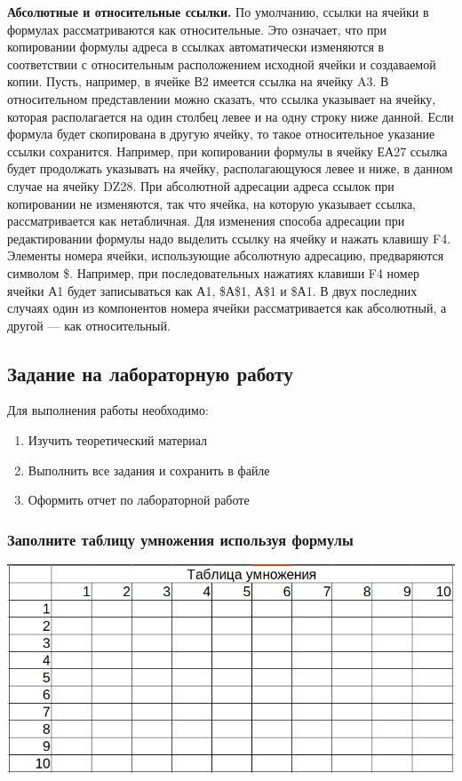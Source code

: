 \documentclass[a4paper]{article}
\begin{document}
\textbf{Абсолютные и относительные ссылки.} По умолчанию, ссылки на ячейки в формулах рассматриваются как относительные. Это означает, что при копировании формулы адреса в ссылках автоматически изменяются в соответствии с относительным расположением исходной ячейки и создаваемой копии. Пусть, например, в ячейке В2 имеется ссылка на ячейку A3. В относительном представлении можно сказать, что ссылка указывает на ячейку, которая располагается на один столбец левее и на одну строку ниже данной. Если формула будет скопирована в другую ячейку, то такое относительное указание ссылки сохранится. Например, при копировании формулы в ячейку ЕА27 ссылка будет продолжать указывать на ячейку, располагающуюся левее и ниже, в данном случае на ячейку DZ28. При абсолютной адресации адреса ссылок при копировании не изменяются, так что ячейка, на которую указывает ссылка, рассматривается как нетабличная. Для изменения способа адресации при редактировании формулы надо выделить ссылку на ячейку и нажать клавишу F4. Элементы номера ячейки, использующие абсолютную адресацию, предваряются символом \$. Например, при последовательных нажатиях клавиши F4 номер ячейки А1 будет записываться как А1, \$А\$1, А\$1 и \$А1. В двух последних случаях один из компонентов номера ячейки рассматривается как абсолютный, а другой --- как относительный.

\newpage
\subsection{Задание на лабораторную работу}

Для выполнения работы необходимо:
\begin{enumerate}
  \item Изучить теоретический материал
  \item Выполнить все задания и сохранить в файле
  \item Оформить отчет по лабораторной работе
\end{enumerate}

\subsubsection{Заполните таблицу умножения используя формулы}

\includegraphics[width=\textwidth]{t1.png}
\end{document}

